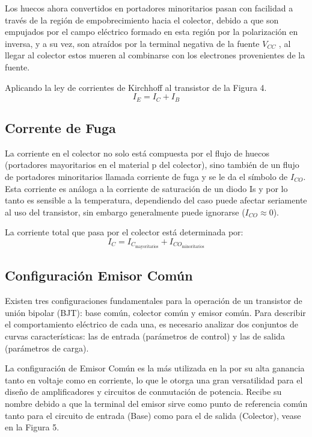 \documentclass[journal]{IEEEtran}
\begin{document}
        Los huecos ahora convertidos en portadores minoritarios pasan con facilidad a través de la región de empobrecimiento hacia el colector, 
        debido a que son empujados por el campo eléctrico formado en esta región por la polarización en inversa,  y a su vez, son atraídos por la 
        terminal negativa de la fuente $V_{CC}$ , al llegar al colector estos mueren al combinarse con los electrones provenientes de la fuente. 
        
        Aplicando la ley de corrientes de Kirchhoff al transistor de la Figura 4.
        \begin{equation}
            I_E = I_C + I_B
            \label{ec:correintesTransistor}
        \end{equation}

    \subsection{Corrente de Fuga}
        La corriente en el colector no solo está compuesta por el flujo de huecos (portadores mayoritarios en el material p del colector),  
        sino también de un flujo de portadores minoritarios llamada corriente de fuga y se le da el símbolo de $I_{CO}$. Esta corriente es 
        análoga a la corriente de saturación de un diodo Is  y por lo tanto es sensible a la temperatura, 
        dependiendo del caso puede afectar seriamente al uso del transistor, sin embargo generalmente puede ignorarse  ($I_{CO} \approx 0 $).
        
        La corriente total que pasa por el colector está determinada por:
        \begin{equation*}
            I_{C} = I_{C_{\text{mayoritarios}}} + I_{CO_{\text{minoritarios}}}
            \label{eq:corriente_colector}
        \end{equation*}
    
    \subsection{Configuración Emisor Común}
        Existen tres configuraciones fundamentales para la operación de un transistor de unión bipolar (BJT): base común, colector común y 
        emisor común. Para describir el comportamiento eléctrico de cada una, es necesario analizar dos conjuntos de curvas características:
        las de entrada (parámetros de control) y las de salida (parámetros de carga).
    
        La configuración de Emisor Común es la más utilizada en la por su alta ganancia tanto en voltaje como en corriente, 
        lo que le otorga una gran versatilidad para el diseño de amplificadores y circuitos de conmutación de potencia. Recibe su 
        nombre debido a que la terminal del emisor sirve como punto de referencia común tanto para el circuito de entrada (Base) 
        como para el de salida (Colector), vease en la Figura 5.
\end{document}

